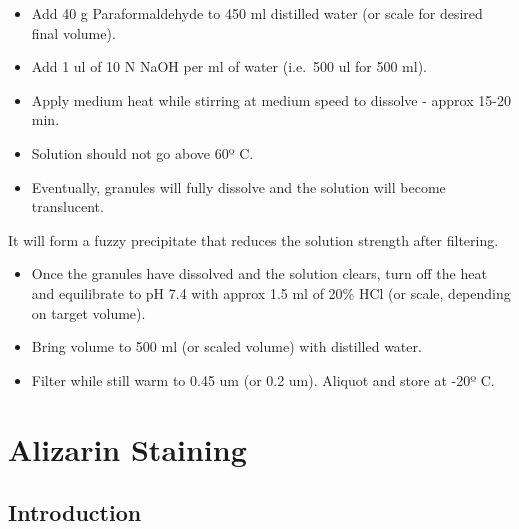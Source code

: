 \documentclass[
  letterpaper,
  DIV=11,
  numbers=noendperiod]{scrreprt}
\begin{document}
\begin{itemize}
\item
  Add 40 g Paraformaldehyde to 450 ml distilled water (or scale for
  desired final volume).
\item
  Add 1 ul of 10 N NaOH per ml of water (i.e.~500 ul for 500 ml).
\item
  Apply medium heat while stirring at medium speed to dissolve - approx
  15-20 min.
\item
  Solution should not go above 60º C.
\item
  Eventually, granules will fully dissolve and the solution will become
  translucent.
\end{itemize}

\begin{tcolorbox}[enhanced jigsaw, toprule=.15mm, breakable, coltitle=black, leftrule=.75mm, title=\textcolor{quarto-callout-note-color}{\faInfo}\hspace{0.5em}{DO NOT LET THE SOLUTION STIR BEYOND THIS POINT}, bottomrule=.15mm, toptitle=1mm, bottomtitle=1mm, colframe=quarto-callout-note-color-frame, opacityback=0, colback=white, opacitybacktitle=0.6, colbacktitle=quarto-callout-note-color!10!white, rightrule=.15mm, titlerule=0mm, arc=.35mm, left=2mm]

It will form a fuzzy precipitate that reduces the solution strength
after filtering.

\end{tcolorbox}

\begin{itemize}
\item
  Once the granules have dissolved and the solution clears, turn off the
  heat and equilibrate to pH 7.4 with approx 1.5 ml of 20\% HCl (or
  scale, depending on target volume).
\item
  Bring volume to 500 ml (or scaled volume) with distilled water.
\item
  Filter while still warm to 0.45 um (or 0.2 um). Aliquot and store at
  -20º C.
\end{itemize}

\hypertarget{sec-molecular_alizarin}{%
\chapter{Alizarin Staining}\label{sec-molecular_alizarin}}

\hypertarget{introduction-15}{%
\section{Introduction}\label{introduction-15}}
\end{document}
